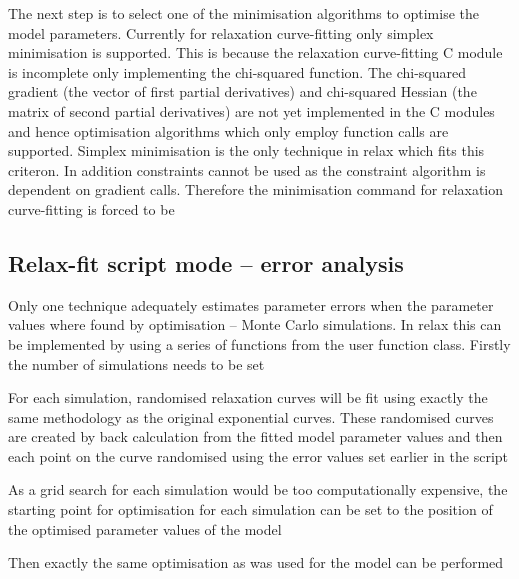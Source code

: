 The next step is to select one of the minimisation algorithms to optimise the model parameters.  Currently for relaxation curve-fitting only simplex minimisation is supported.  This is because the relaxation curve-fitting C module is incomplete only implementing the chi-squared function.  The chi-squared gradient (the vector of first partial derivatives) and chi-squared Hessian (the matrix of second partial derivatives) are not yet implemented in the C modules and hence optimisation algorithms which only employ function calls are supported.  Simplex minimisation is the only technique in relax which fits this criteron.  In addition constraints cannot be used as the constraint algorithm is dependent on gradient calls.  Therefore the minimisation command for relaxation curve-fitting is forced to be





\subsection{Relax-fit script mode -- error analysis}

Only one technique adequately estimates parameter errors when the parameter values where found by optimisation -- Monte Carlo simulations.  In relax this can be implemented by using a series of functions from the  user function class.  Firstly the number of simulations needs to be set


For each simulation, randomised relaxation curves will be fit using exactly the same methodology as the original exponential curves.  These randomised curves are created by back calculation from the fitted model parameter values and then each point on the curve randomised using the error values set earlier in the script


As a grid search for each simulation would be too computationally expensive, the starting point for optimisation for each simulation can be set to the position of the optimised parameter values of the model


Then exactly the same optimisation as was used for the model can be performed

